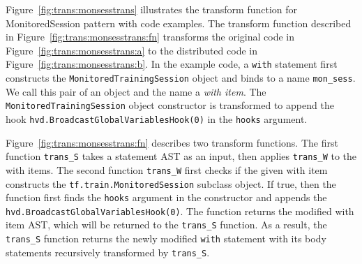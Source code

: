 \begin{inred}
Figure~\ref{fig:trans:monsesstrans} illustrates the transform function for
MonitoredSession pattern with code examples.
The transform function described in Figure~\ref{fig:trans:monsesstrans:fn}
transforms the original code in Figure~\ref{fig:trans:monsesstrans:a}
to the distributed code in Figure~\ref{fig:trans:monsesstrans:b}.
In the example code, a {\tt with} statement first constructs 
the {\tt MonitoredTrainingSession} object and binds to a name {\tt mon\_sess}.
We call this pair of an object and the name a {\it with item}.
The {\tt MonitoredTrainingSession} object constructor is transformed
to append the hook {\tt hvd.BroadcastGlobalVariablesHook(0)} in the {\tt hooks}
argument.

Figure~\ref{fig:trans:monsesstrans:fn} describes two transform functions.
The first function {\tt trans\_S} takes a statement AST as an input,
then applies {\tt trans\_W} to the with items. 
The second function {\tt trans\_W} first checks if the given with item  
constructs the {\tt tf.train.MonitoredSession} subclass object.
If true, then the function first finds the {\tt hooks} argument
in the constructor and appends the {\tt hvd.BroadcastGlobalVariablesHook(0)}.
The function returns the modified with item AST,
which will be returned to the {\tt trans\_S} function.
As a result, the {\tt trans\_S} function returns the
newly modified {\tt with} statement with its body statements
recursively transformed by {\tt trans\_S}.
\end{inred}

